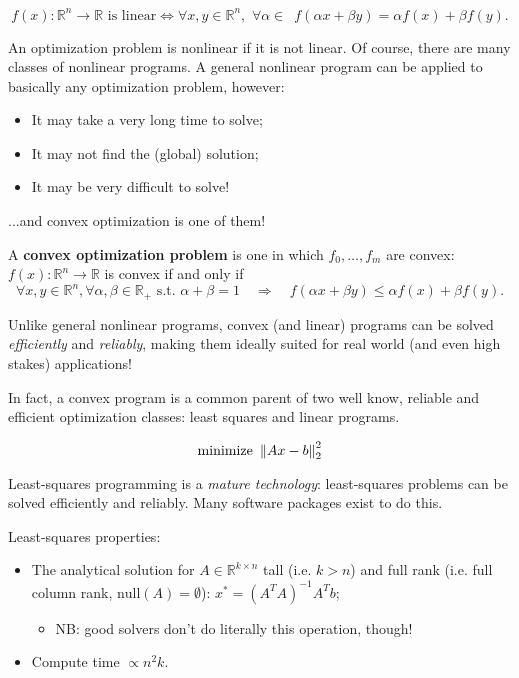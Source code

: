\message{ !name(document.tex)}\documentclass[twocolumn]{article}
\begin{document}
$$
f(x):\mathbb R^n\to\mathbb R\text{ is linear}\Leftrightarrow \forall x,y\in\mathbb R^n,\,\,\forall\alpha\in\mathbb \,\,\, f(\alpha x+\beta y)=\alpha f(x)+\beta f(y).
$$


An optimization problem is nonlinear if it is not linear. Of course, there are many classes of nonlinear programs. A general nonlinear program can be applied to basically any optimization problem, however:

\begin{itemize}
\item It may take a very long time to solve;
\item It may not find the (global) solution;
\item It may be very difficult to solve!
\end{itemize}


...and convex optimization is one of them!

\begin{Definition}
  A \textbf{convex optimization problem} is one in which $f_0,\ldots,f_m$ are convex:
  $f(x):\mathbb R^n\to\mathbb R$ is convex if and only if $$
  \forall x,y\in\mathbb R^n, \forall \alpha,\beta\in\mathbb R_{+}\text{ s.t. }\alpha+\beta=1\quad\Rightarrow\quad f(\alpha x+\beta y)\le \alpha f(x)+\beta f(y).
  $$
\end{Definition}

Unlike general nonlinear programs, convex (and linear) programs can be solved \textit{efficiently} and \textit{reliably}, making them ideally suited for real world (and even high stakes) applications!

In fact, a convex program is a common parent of two well know, reliable and efficient optimization classes: least squares and linear programs.


\begin{Definition}
  \begin{equation*}
    \text{minimize}\,\, \left\|Ax-b\right\|_{2}^2
  \end{equation*}
\end{Definition}

Least-squares programming is a \textit{mature technology}: least-squares problems can be solved efficiently and reliably. Many software packages exist to do this.

\begin{Fact}
  Least-squares properties:
  \begin{itemize}
  \item The analytical solution for $A\in\mathbb R^{k\times n}$ tall (i.e. $k>n$) and full rank (i.e. full column rank, $\text{null}(A)=\emptyset$): $x^*=(A^TA)^{-1}A^Tb$;
    \begin{itemize}
    \item NB: good solvers don't do literally this operation, though!
    \end{itemize}
  \item Compute time $\propto n^2k$.
  \end{itemize}
\end{Fact}
\end{document}
